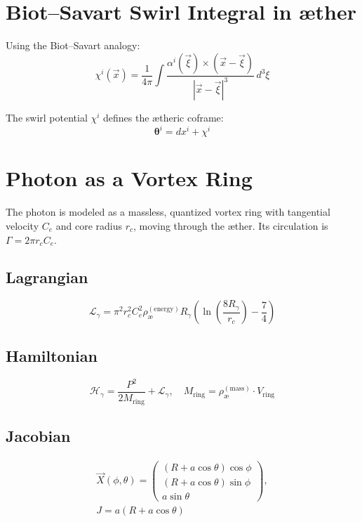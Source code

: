 \section{Biot--Savart Swirl Integral in \ae ther}\label{sec:biot-savart}

        Using the Biot--Savart analogy:
        \begin{equation}
            \chi^i(\vec{x}) = \frac{1}{4\pi} \int \frac{\alpha^i(\vec{\xi}) \times (\vec{x} - \vec{\xi})}{|\vec{x} - \vec{\xi}|^3} \, d^3\xi
        \end{equation}

        The swirl potential $\chi^i$ defines the \ae theric coframe:
        \begin{equation}
            \boldsymbol{\theta}^i = dx^i + \chi^i
        \end{equation}

\section{Photon as a Vortex Ring}

        The photon is modeled as a massless, quantized vortex ring with tangential velocity $C_e$ and core radius $r_c$, moving through the \ae ther. Its circulation is $\Gamma = 2\pi r_c C_e$.

        \subsection{Lagrangian}
        \begin{equation}
            \mathcal{L}_\gamma = \pi^2 r_c^2 C_e^2 \rho_\text{\ae}^{(\text{energy})} R_\gamma \left( \ln\left( \frac{8R_\gamma}{r_c} \right) - \frac{7}{4} \right)
        \end{equation}

        \subsection{Hamiltonian}
        \begin{equation}
            \mathcal{H}_\gamma = \frac{P^2}{2M_{\text{ring}}} + \mathcal{L}_\gamma, \quad M_{\text{ring}} = \rho_\text{\ae}^{(\text{mass})} \cdot V_{\text{ring}}
        \end{equation}

        \subsection{Jacobian}
        \begin{align}
            \vec{X}(\phi,\theta) =
            \begin{pmatrix}
            (R + a\cos\theta)\cos\phi \\
            (R + a\cos\theta)\sin\phi \\
            a\sin\theta
            \end{pmatrix}, \\
            J = a(R + a\cos\theta)
        \end{align}

